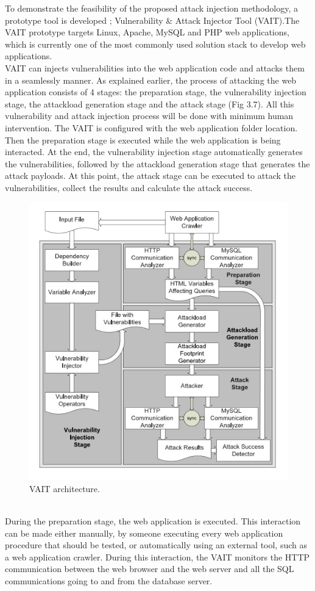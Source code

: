To demonstrate the feasibility of the proposed attack injection methodology, a prototype tool is developed ; Vulnerability \& Attack Injector Tool (VAIT).The VAIT prototype targets Linux, Apache, MySQL and PHP web applications, which is currently one of the most commonly used solution stack to develop web applications.\\
\newline
VAIT can injects vulnerabilities into the web application code and attacks them
in a seamlessly manner. As explained earlier, the process of attacking the web application
consists of 4 stages: the preparation stage, the vulnerability
injection stage, the attackload generation stage and the attack
stage (Fig 3.7). All this vulnerability and attack injection process will
be done with minimum human intervention.  The VAIT is
configured with the web application folder location. Then
the preparation stage is executed while the web application is being interacted. At the end, the vulnerability
injection stage automatically generates the vulnerabilities,
followed by the attackload generation stage that generates the attack payloads. At this point, the attack stage
can be executed to attack the vulnerabilities, collect the
results and calculate the attack success.
\begin{figure}
\centering
\includegraphics[width=0.7\linewidth]{Main/fig7}
\caption{VAIT architecture.}
\label{fig:fig7}
\end{figure}\\
\newline
During the preparation stage, the web application is executed. This interaction can be made either manually, by someone executing every web application procedure that should be tested, or automatically using an external tool, such as a web application crawler. During this interaction, the VAIT monitors the HTTP communication between the web browser and the web server and all the SQL communications going to and from the database server.\\
